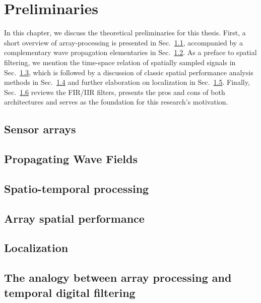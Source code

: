 \chapter{Preliminaries}
\label{chap:prelims}
In this chapter, we discuss the theoretical preliminaries for this thesis.
First, a short overview of array-processing is presented in Sec.~\ref{sec:prlm_sensorArrays}, accompanied by a complementary wave propagation elementaries in Sec.~\ref{sec:prlm_propWaveField}.
As a preface to spatial filtering, we mention the time-space relation of spatially sampled signals in Sec.~\ref{sec:prlm_timeSpaceSig}, which is followed by a discussion of classic spatial performance analysis methods in Sec.~\ref{sec:prlm_array_perf} and further elaboration on
localization in Sec.~\ref{sec:prlm_localization}.
Finally, Sec.~\ref{sec:prlm_FIR_IIR} reviews the FIR/IIR filters, presents the pros and cons of both architectures and serves as the foundation for this research's motivation.
\section{Sensor arrays}
\label{sec:prlm_sensorArrays}

\section{Propagating Wave Fields}
\label{sec:prlm_propWaveField}

\section{Spatio-temporal processing}
\label{sec:prlm_timeSpaceSig}

\section{Array spatial performance}
\label{sec:prlm_array_perf}

\section{Localization}
\label{sec:prlm_localization}

\section{The analogy between array processing and temporal digital filtering}
\label{sec:prlm_FIR_IIR}

